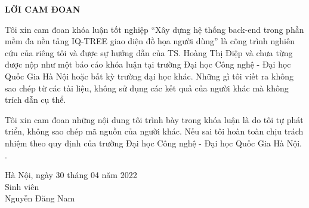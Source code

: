 \documentclass[12pt]{report}
\begin{document}
\newpage
\begin{center}
	\textbf{\large LỜI CAM ĐOAN}
\end{center}

Tôi xin cam đoan khóa luận tốt nghiệp “Xây dựng hệ thống back-end trong phần mềm đa nền tảng IQ-TREE giao diện đồ họa người dùng” là công trình nghiên cứu của riêng tôi và được sự hướng dẫn của TS. Hoàng Thị Điệp và chưa từng được nộp như một báo cáo khóa luận tại trường Đại học Công nghệ - Đại học Quốc Gia Hà Nội hoặc bất kỳ trường đại học khác. Những gì tôi viết ra không sao chép từ các tài liệu, không sử dụng các kết quả của người khác mà không trích dẫn cụ thể.

Tôi xin cam đoan những nội dung tôi trình bày trong khóa luận là do tôi tự phát triển, không sao chép mã nguồn của người khác. Nếu sai tôi hoàn toàn chịu trách nhiệm theo quy định của trường Đại học Công nghệ - Đại học Quốc Gia Hà Nội.
.\\

\begin{flushright}
	\begin{varwidth}{\linewidth}\centering
		Hà Nội, ngày 30 tháng 04 năm 2022\\
		Sinh viên\\[2cm]
		Nguyễn Đăng Nam
	\end{varwidth}
\end{flushright}

\newpage
\tableofcontents

\newpage
{}
\listoftables
\end{document}
